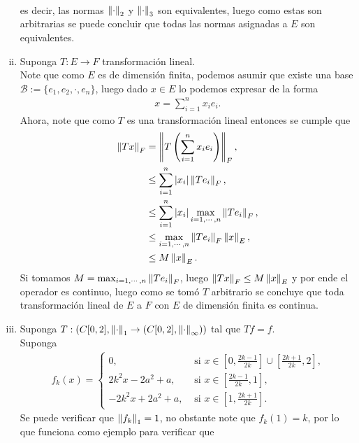 \begin{homeworkProblem}
\begin{solution}
\begin{enumerate}[(i)]
\begin{align*}
        \end{align*}
        es decir, las normas $\left\|\cdot\right\|_{2}$ y $\left\|\cdot\right\|_{3}$ son equivalentes, luego como estas son arbitrarias se puede concluir que todas las normas asignadas a $E$ son equivalentes.
      \item Suponga $T:E\to F$ transformación lineal.\\
        Note que como $E$ es de dimensión finita, podemos asumir que existe una base $\mathcal{B}:=\{e_1,e_2,\cdot,e_n\}$, luego dado $x\in E$ lo podemos expresar de la forma
        \begin{align*}
          x=\sum_{i=1}^{n}x_ie_i.
        \end{align*}
        Ahora, note que como $T$ es una transformación lineal entonces se cumple que
        \begin{align*}
          \left\|Tx\right\|_{F}&=\left\|T\left( \sum_{i=1}^{n}x_ie_i \right)\right\|_{F},\\
          &\leq\sum_{i=1}^{n}|x_i|\left\|Te_i\right\|_{F},\\
          &\leq\sum_{i=1}^{n}|x_i|\max_{i=1,\cdots,n}\left\|Te_i\right\|_{F},\\
          &\leq \max_{i=1,\cdots,n}\left\|Te_i\right\|_{F} \left\|x\right\|_{E},\\
          &\leq M\left\|x\right\|_{E}.
        \end{align*}
        Si tomamos $M=\max_{i=1,\cdots,n}\left\|Te_i\right\|_{F}$, luego $\left\|Tx\right\|_{F}\leq M\left\|x\right\|_{E}$ y por ende el operador es continuo, luego como se tomó $T$ arbitrario se concluye que toda transformación lineal de $E$ a $F$ con $E$ de dimensión finita es continua.
      \item Suponga $T:(C[0,2],\left\|\cdot\right\|_{1}\to(C[0,2],\left\|\cdot\right\|_{\infty}))$ tal que $Tf=f$.\\
      Suponga 
      \begin{align*}
        f_k(x)= 
        \begin{cases}
          0, &\text{ si } x\in[0,\frac{2k-1}{2k}]\cup[\frac{2k+1}{2k},2] \text{,} \\
          2k^2x-2a^2+a, &\text{ si } x\in[\frac{2k-1}{2k},1],\\
          -2k^2x+2a^2+a, &\text{ si } x\in[1,\frac{2k+1}{2k}].
        \end{cases}
      \end{align*}
      Se puede verificar que $\left\|f_k\right\|_{1}=1$, no obstante note que $f_{k}(1)=k$, por lo que funciona como ejemplo para verificar que
      \begin{align*}

\end{align*}
\end{enumerate}
\end{solution}
\end{homeworkProblem}
